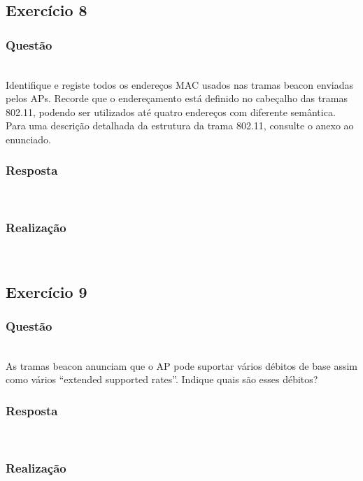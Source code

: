\documentclass{llncs}
\begin{document}
\clearpage
\subsection{Exercício 8}
\subsubsection{Questão}\rule[-10pt]{0pt}{10pt}\\

Identifique e registe todos os endereços MAC usados nas tramas beacon enviadas pelos APs. Recorde que o endereçamento está definido no cabeçalho das tramas 802.11, podendo ser utilizados até quatro endereços com diferente semântica. Para uma descrição detalhada da estrutura da trama 802.11, consulte o anexo ao enunciado.

\subsubsection{Resposta}\rule[-10pt]{0pt}{10pt}\\



\subsubsection{Realização}\rule[-10pt]{0pt}{10pt}\\



\clearpage
\subsection{Exercício 9}
\subsubsection{Questão}\rule[-10pt]{0pt}{10pt}\\

As tramas beacon anunciam que o AP pode suportar vários débitos de base assim como vários “extended supported rates”. Indique quais são esses débitos?

\subsubsection{Resposta}\rule[-10pt]{0pt}{10pt}\\



\subsubsection{Realização}\rule[-10pt]{0pt}{10pt}\\
\end{document}
